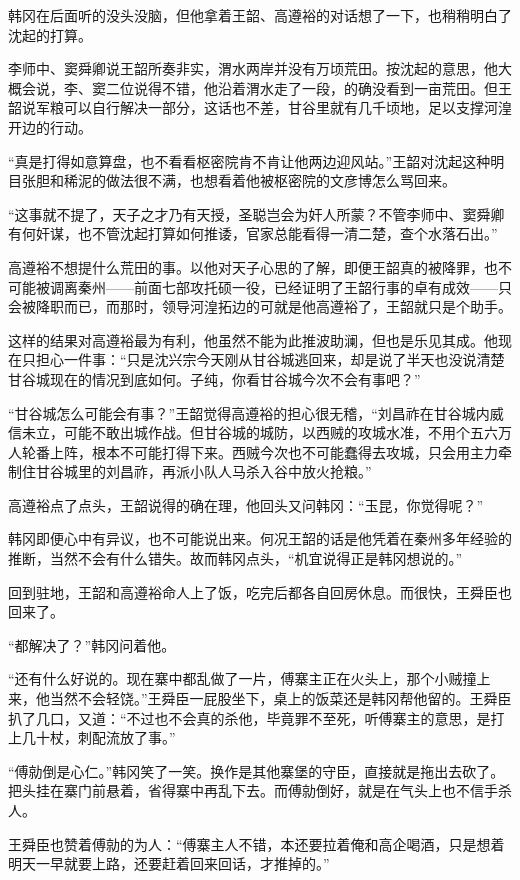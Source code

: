 韩冈在后面听的没头没脑，但他拿着王韶、高遵裕的对话想了一下，也稍稍明白了沈起的打算。

李师中、窦舜卿说王韶所奏非实，渭水两岸并没有万顷荒田。按沈起的意思，他大概会说，李、窦二位说得不错，他沿着渭水走了一段，的确没看到一亩荒田。但王韶说军粮可以自行解决一部分，这话也不差，甘谷里就有几千顷地，足以支撑河湟开边的行动。

“真是打得如意算盘，也不看看枢密院肯不肯让他两边迎风站。”王韶对沈起这种明目张胆和稀泥的做法很不满，也想看着他被枢密院的文彦博怎么骂回来。

“这事就不提了，天子之才乃有天授，圣聪岂会为奸人所蒙？不管李师中、窦舜卿有何奸谋，也不管沈起打算如何推诿，官家总能看得一清二楚，查个水落石出。”

高遵裕不想提什么荒田的事。以他对天子心思的了解，即便王韶真的被降罪，也不可能被调离秦州——前面七部攻托硕一役，已经证明了王韶行事的卓有成效——只会被降职而已，而那时，领导河湟拓边的可就是他高遵裕了，王韶就只是个助手。

这样的结果对高遵裕最为有利，他虽然不能为此推波助澜，但也是乐见其成。他现在只担心一件事：“只是沈兴宗今天刚从甘谷城逃回来，却是说了半天也没说清楚甘谷城现在的情况到底如何。子纯，你看甘谷城今次不会有事吧？”

“甘谷城怎么可能会有事？”王韶觉得高遵裕的担心很无稽，“刘昌祚在甘谷城内威信未立，可能不敢出城作战。但甘谷城的城防，以西贼的攻城水准，不用个五六万人轮番上阵，根本不可能打得下来。西贼今次也不可能蠢得去攻城，只会用主力牵制住甘谷城里的刘昌祚，再派小队人马杀入谷中放火抢粮。”

高遵裕点了点头，王韶说得的确在理，他回头又问韩冈：“玉昆，你觉得呢？”

韩冈即便心中有异议，也不可能说出来。何况王韶的话是他凭着在秦州多年经验的推断，当然不会有什么错失。故而韩冈点头，“机宜说得正是韩冈想说的。”

回到驻地，王韶和高遵裕命人上了饭，吃完后都各自回房休息。而很快，王舜臣也回来了。

“都解决了？”韩冈问着他。

“还有什么好说的。现在寨中都乱做了一片，傅寨主正在火头上，那个小贼撞上来，他当然不会轻饶。”王舜臣一屁股坐下，桌上的饭菜还是韩冈帮他留的。王舜臣扒了几口，又道：“不过也不会真的杀他，毕竟罪不至死，听傅寨主的意思，是打上几十杖，刺配流放了事。”

“傅勍倒是心仁。”韩冈笑了一笑。换作是其他寨堡的守臣，直接就是拖出去砍了。把头挂在寨门前悬着，省得寨中再乱下去。而傅勍倒好，就是在气头上也不信手杀人。

王舜臣也赞着傅勍的为人：“傅寨主人不错，本还要拉着俺和高企喝酒，只是想着明天一早就要上路，还要赶着回来回话，才推掉的。”

